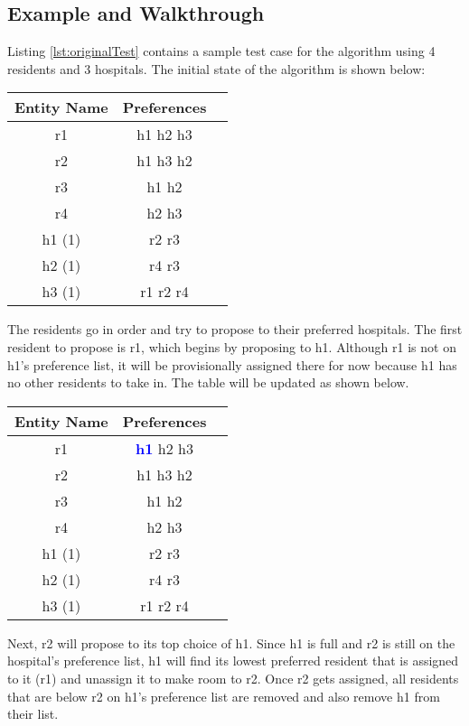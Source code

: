 \documentclass[letterpaper, 10pt,DIV=13]{scrartcl}
\numberwithin{equation}{section} %
\numberwithin{figure}{section} %
\numberwithin{table}{section} %
\begin{document}
\subsection{Example and Walkthrough}
Listing \ref{lst:originalTest} contains a sample test case for the algorithm using 4 residents and 3 hospitals. The initial state of the algorithm is shown below:

\begin{center}
  \begin{tabular}{|c|c|c|}
    \hline
    Entity Name & Preferences \\
    \hline
    r1 & h1 h2 h3 \\
    \hline
    r2 & h1 h3 h2 \\
    \hline
    r3 & h1 h2 \\
    \hline
    r4 & h2 h3 \\
    \hline
    \hline
    h1 (1) & r2 r3 \\
    \hline
    h2 (1) & r4 r3 \\
    \hline
    h3 (1) & r1 r2 r4 \\
    \hline
  \end{tabular}
\end{center}

The residents go in order and try to propose to their preferred hospitals. The first resident to propose is r1, which begins by proposing to h1. Although r1 is not on h1's preference list, it will be provisionally assigned there for now because h1 has no other residents to take in. The table will be updated as shown below.

\begin{center}
  \begin{tabular}{|c|c|c|}
    \hline
    Entity Name & Preferences \\
    \hline
    r1 & \textcolor{blue}{\textbf{h1}} h2 h3 \\
    \hline
    r2 & h1 h3 h2 \\
    \hline
    r3 & h1 h2 \\
    \hline
    r4 & h2 h3 \\
    \hline
    \hline
    h1 (1) & r2 r3 \\
    \hline
    h2 (1) & r4 r3 \\
    \hline
    h3 (1) & r1 r2 r4 \\
    \hline
  \end{tabular}
\end{center}

Next, r2 will propose to its top choice of h1. Since h1 is full and r2 is still on the hospital's preference list, h1 will find its lowest preferred resident that is assigned to it (r1) and unassign it to make room to r2. Once r2 gets assigned, all residents that are below r2 on h1's preference list are removed and also remove h1 from their list.
\end{document}
